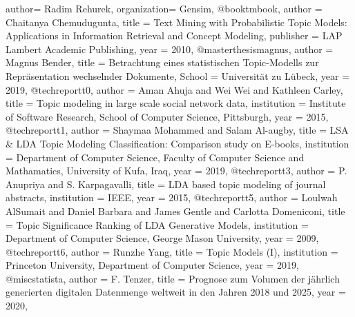 \documentclass[german,version-2020-11]{uzl-thesis}
\begin{document}
\begin{bibtex-entries}
{  author= {Radim Rehurek},
  organization= {Gensim},
}
  @book{tmbook,
  author =       {Chaitanya Chemudugunta},
  title =        {Text Mining with Probabilistic Topic Models: Applications in Information Retrieval and Concept Modeling},
  publisher = {LAP Lambert Academic Publishing},
  year =    {2010},
}
  @masterthesis{magnus,
  author =       {Magnus Bender},
  title =        {Betrachtung eines statistischen Topic-Modells zur Repräsentation wechselnder Dokumente},
  School = {Universität zu Lübeck},
  year =    {2019},
}
  @techreport{t0,
  author =       {Aman Ahuja and Wei Wei and Kathleen Carley},
  title =        {Topic modeling in large scale social network data},
  institution = {Institute of Software Research, School of Computer Science, Pittsburgh},
  year =    {2015},
}
  @techreport{t1,
  author =       {Shaymaa Mohammed and Salam Al-augby},
  title =        {LSA \& LDA Topic Modeling Classification: Comparison study on E-books},
  institution = {Department of Computer Science, Faculty of Computer Science and Mathamatics, University of Kufa, Iraq},
  year =    {2019},
}
  @techreport{t3,
  author =       {P. Anupriya and S. Karpagavalli},
  title =        {LDA based topic modeling of journal abstracts},
  institution = {IEEE},
  year =    {2015},
}
  @techreport{t5,
  author =       {Loulwah AlSumait and Daniel Barbara and James Gentle and Carlotta Domeniconi},
  title =        {Topic Significance Ranking of LDA Generative Models},
  institution = {Department of Computer Science, George Mason University},
  year =    {2009},
}
  @techreport{t6,
  author =       {Runzhe Yang},
  title =        {Topic Models (I)},
  institution = {Princeton University, Department of Computer Science},
  year =    {2019},
}
  @misc{statista,
  author =       {F. Tenzer},
  title =        {Prognose zum Volumen der jährlich generierten digitalen Datenmenge weltweit in den Jahren 2018 und 2025},
  year =    {2020},
}
\end{bibtex-entries}
\end{document}
